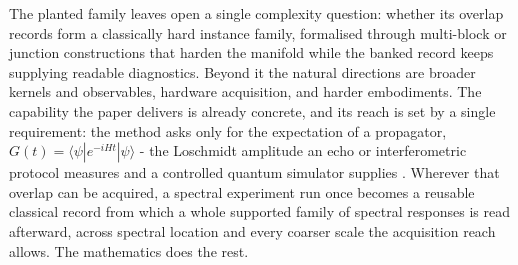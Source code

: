 The planted family leaves open a single complexity question: whether its overlap records form a classically hard instance family, formalised through multi-block or junction constructions that harden the manifold while the banked record keeps supplying readable diagnostics. Beyond it the natural directions are broader kernels and observables, hardware acquisition, and harder embodiments. The capability the paper delivers is already concrete, and its reach is set by a single requirement: the method asks only for the expectation of a propagator, $G(t) = \langle\psi|e^{-iHt}|\psi\rangle$ - the Loschmidt amplitude an echo or interferometric protocol measures \cite{gorin2006loschmidt} and a controlled quantum simulator supplies \cite{georgescu2014sim}. Wherever that overlap can be acquired, a spectral experiment run once becomes a reusable classical record from which a whole supported family of spectral responses is read afterward, across spectral location and every coarser scale the acquisition reach allows. The mathematics does the rest.
